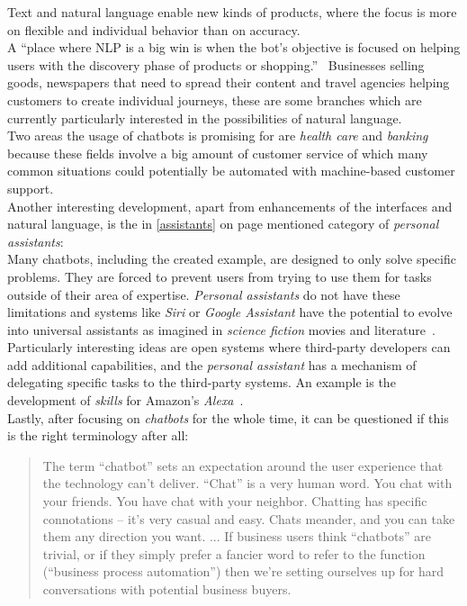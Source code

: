 Text and natural language enable new kinds of products, where the focus is more on flexible and individual behavior than on accuracy.
\\
A ``place where NLP is a big win is when the bot’s objective is focused on helping users with the discovery phase of products or shopping.''~\cite{neednlp}
Businesses selling goods, newspapers that need to spread their content and travel agencies helping customers to create individual journeys,
these are some branches which are currently particularly interested in the possibilities of natural language.
\\
Two areas the usage of chatbots is promising for are \emph{health care} and \emph{banking}~\cite{botlist}
because these fields involve a big amount of customer service of which many common situations could potentially be automated with machine-based customer support.
\\

Another interesting development, apart from enhancements of the interfaces and natural language, is the in \ref{assistants} on page \pageref{assistants} mentioned category of \emph{personal assistants}:
\\

Many chatbots, including the created example, are designed to only solve specific problems.
They are forced to prevent users from trying to use them for tasks outside of their area of expertise.
\emph{Personal assistants} do not have these limitations
and systems like \emph{Siri} or \emph{Google Assistant} have the potential to evolve into universal assistants as imagined in \emph{science fiction} movies and literature~\cite{assistant}.
\\

Particularly interesting ideas are open systems where third-party developers can add additional capabilities,
and the \emph{personal assistant} has a mechanism of delegating specific tasks to the third-party systems.
An example is the development of \emph{skills} for Amazon's \emph{Alexa}~\cite{alexa}.
\\

Lastly, after focusing on \emph{chatbots} for the whole time,
it can be questioned if this is the right terminology after all:

\begin{quote}
The term “chatbot” sets an expectation around the user experience that the technology can’t deliver.
“Chat” is a very human word.
You chat with your friends.
You have chat with your neighbor.
Chatting has specific connotations – it’s very casual and easy.
Chats meander, and you can take them any direction you want.
...
If business users think “chatbots” are trivial, or if they simply prefer a fancier word to refer to the function (“business process automation”) then we’re setting ourselves up for hard conversations with potential business buyers.~\cite{botnerds}
\end{quote}

